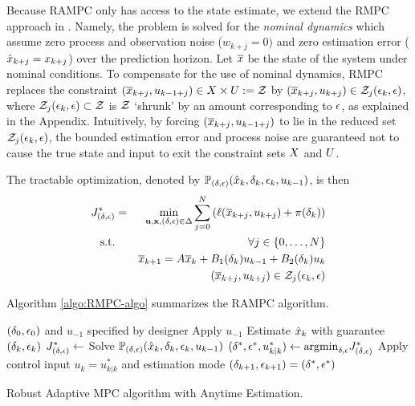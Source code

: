 Because RAMPC only has access to the state estimate, we extend the RMPC approach in \cite{richardsetal05rmp, chiscietal01swp}.
Namely, the problem is solved for the \emph{nominal dynamics} which assume zero process and observation noise ($w_{k+j} = 0)$ and zero estimation error ($\hat{x}_{k+j}=x_{k+j}$) over the prediction horizon.
Let $\overline{x}$ be the state of the system under nominal conditions.
To compensate for the use of nominal dynamics, RMPC replaces the constraint $(\overline{x}_{k+j},u_{k-1+j}) \in X \times U := \mathcal{Z}$ 
by $(\overline{x}_{k+j},u_{k+j}) \in \mathcal{Z}_{j}(\epsilon_k,\epsilon)$,
where $\mathcal{Z}_{j}(\epsilon_k,\epsilon) \subset \mathcal{Z}$ is $\mathcal{Z}$ `shrunk' by an amount corresponding to $\epsilon$, as explained in the Appendix.
Intuitively, by forcing $(\overline{x}_{k+j},u_{k-1+j})$ to lie in the reduced set $\mathcal{Z}_{j}(\epsilon_k,\epsilon)$, the bounded estimation error and process noise are guaranteed not to cause the true state and input to exit the constraint sets $X$ and $U$.

The tractable optimization, denoted by $\mathbb{P}_{(\delta,\epsilon)}(\hat{x}_{k},\delta_{k},\epsilon_{k},u_{k -1})$, is then 
\begin{eqnarray}
\label{eq:tractableOptim}
J^*_{(\delta,\epsilon)} &=& \min_{\mathbf{u},\mathbf{x},(\delta,\epsilon) \in \Delta}\sum_{j=0}^{N}\left(\ell(\overline{x}_{k+j},u_{k+j})+\pi(\delta_k)\right)
\\
\textrm{s.t.} &&\forall j \in \{0,\ldots,N\}
\nonumber
\\
&&\overline{x}_{k+1}=A \overline{x}_{k}+B_{1}(\delta_k)u_{k-1}+B_{2}(\delta_k)u_{k}
\nonumber
\\
&& (\overline{x}_{k+j},u_{k+j}) \in \mathcal{Z}_{j}(\epsilon_k,\epsilon)
\nonumber
\end{eqnarray}

Algorithm \ref{algo:RMPC-algo} summarizes the RAMPC algorithm.
\begin{algorithm}
	\begin{algorithmic}[1]
		\State $(\delta_{0},\epsilon_{0})$ and $u_{-1}$ specified by designer
		\State Apply $u_{-1}$
		\State Estimate $\hat{x}_{k}$ with guarantee $\left(\delta_k, \epsilon_k\right)$
		\State $J_{(\delta,\epsilon)}^* \leftarrow $ Solve $\mathbb{P}_{(\delta,\epsilon)}(\hat{x}_{k},\delta_{k},\epsilon_{k},u_{k -1})$		
		\EndFor
		\State $( \delta^{*}, \epsilon^{*}, u_{k | k}^{*} ) \gets \text{argmin}_{\delta,\epsilon} J_{(\delta,\epsilon)}^*$
		\State Apply control input $u_{k} = u_{k | k}^{*}$ and estimation mode $(\delta_{k+1},\epsilon_{k+1}) = \left( \delta^{*}, \epsilon^{*} \right)$
		\EndFor
	\end{algorithmic} 
	
	\caption{Robust Adaptive MPC algorithm with Anytime Estimation.}
	\label{algo:RMPC-algo}
\end{algorithm}


